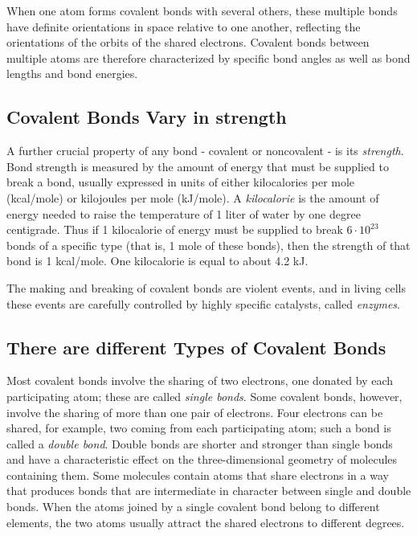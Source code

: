 When one atom forms covalent bonds with several others, these multiple
bonds have definite orientations in space relative to one another, reflecting
the orientations of the orbits of the shared electrons. Covalent bonds
between multiple atoms are therefore characterized by specific bond
angles as well as bond lengths and bond energies.

\subsection{Covalent Bonds Vary in strength}

A further crucial property of any bond - covalent or noncovalent - is its \textit{strength}. Bond
strength is measured by the amount of energy that must be supplied to
break a bond, usually expressed in units of either kilocalories per mole
(kcal/mole) or kilojoules per mole (kJ/mole). A \textit{kilocalorie} is the amount
of energy needed to raise the temperature of 1 liter of water by one degree centigrade. Thus
if 1 kilocalorie of energy must be supplied to break $6 \cdot 10^{23}$ bonds of a
specific type (that is, 1 mole of these bonds), then the strength of that
bond is 1 kcal/mole. One kilocalorie is equal to about 4.2 kJ.

The making and breaking of covalent bonds are violent events, and in living
cells these events are carefully controlled by highly specific catalysts,
called \textit{enzymes}.

\subsection{There are different Types of Covalent Bonds}

Most covalent bonds involve the sharing of two electrons, one donated
by each participating atom; these are called \textit{single bonds}. Some covalent
bonds, however, involve the sharing of more than one pair of electrons.
Four electrons can be shared, for example, two coming from each participating
atom; such a bond is called a \textit{double bond}. Double bonds are
shorter and stronger than single bonds and have a characteristic effect
on the three-dimensional geometry of molecules containing them.
Some molecules contain atoms that share electrons in a way that produces
bonds that are intermediate in character between single and double
bonds.
When the atoms joined by a single covalent bond belong to different elements,
the two atoms usually attract the shared electrons to different degrees.


